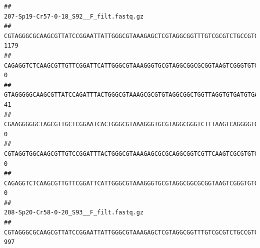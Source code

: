 \documentclass[]{article}
\begin{document}
\begin{verbatim}
##                                                                                                                                                                                                                                                           207-Sp19-Cr57-0-18_S92__F_filt.fastq.gz
## CGTAGGGCGCAAGCGTTATCCGGAATTATTGGGCGTAAAGAGCTCGTAGGCGGTTTGTCGCGTCTGCCGTGAAAGTCCGGGGCTCAACTCCGGATCTGCGGTGGGTACGGGCAGACTAGAGTGATGTAGGGGAGACTGGAATTCCTGGTGTAGCGGTGAAATGCGCAGATATCAGGAGGAACACCGATGGCGAAGGCAGGTCTCTGGGCATTAACTGACGCTGAGGAGCGAAAGCATGGGGAGCGAACA                                    1179
## CAGAGGTCTCAAGCGTTGTTCGGATTCATTGGGCGTAAAGGGTGCGTAGGCGGCGCGGTAAGTCGGGTGTGAAATCTCGGAGCTTAACTCCGAAACTGCATTCGATACTGCCGTGCTTGAGGACTGGAGAGGAGACTGGAATTTACGGTGTAGCGGTGAAATGCGTAGATATCGTAAGGAAGACCAGTGGCGAAGGCGGGTCTCTGGACAGTTCCTGACGCTGAGGCACGAAGGCCAGGGGAGCAAACG                                       0
## GTAGGGGGCAAGCGTTATCCAGATTTACTGGGCGTAAAGCGCGTGTAGGCGGCTGGTTAGGTGTGATGTGAAATCTTCCGGCTCAACCGGAAAACTGCATTGCAAACCGGCCTGGCTAGAGTGCAGGAGAGGGAAGCGGAATTCCAGGTGTAGCGGTGAAATGCGTAGATATCTGGAGGAACACCAGTGGCGAAGGCGGCTTCCTGGCCTGCAACTGACGCTGAGACGCGAAAGCGTGGGGAGCGAAC                                       41
## CGAAGGGGGCTAGCGTTGCTCGGAATCACTGGGCGTAAAGGGTGCGTAGGCGGGTCTTTAAGTCAGGGGTGAAATCCTGGAGCTCAACTCCAGAACTGCCTTTGATACTGAAGATCTTGAGTTCGGGAGAGGTGAGTGGAACTGCGAGTGTAGAGGTGAAATTCGTAGATATTCGCAAGAACACCAGTGGCGAAGGCGGCTCACTGGCCCGATACTGACGCTGAGGCACGAAAGCGTGGGGAGCAAACA                                       0
## CGTAGGTGGCAAGCGTTGTCCGGATTTACTGGGCGTAAAGAGCGCGCAGGCGGTCGTTCAAGTCGCGTGTGAAAGCCCCCGGCTCAACTGGGGAGGGTCACGCGATACTGATCGACTCGAAGGCAGGAGAGGGTAGTGGAATTCCCGGTGTAGTGGTGAAATGCGTAGATATCGGGAGGAACACCAGTGGCGAAGGCGACTACCTGGCCTGTTCTTGACGCTGAGGCGCGAAAGCTAGGGGAGCAAACG                                       0
## CAGAGGTCTCAAGCGTTGTTCGGATTCATTGGGCGTAAAGGGTGCGTAGGCGGCGCGGTAAGTCGGGTGTGAAATCTCGGGGCTTAACTCCGAAACTGCATTCGATACTGCCGTGCTTGAGGACTGGAGAGGAGACTGGAATTTACGGTGTAGCGGTGAAATGCGTAGATATCGTAAGGAAGACCAGTGGCGAAGGCGGGTCTCTGGACAGTTCCTGACGCTGAGGCACGAAGGCCAGGGGAGCAAACG                                       0
##                                                                                                                                                                                                                                                           208-Sp20-Cr58-0-20_S93__F_filt.fastq.gz
## CGTAGGGCGCAAGCGTTATCCGGAATTATTGGGCGTAAAGAGCTCGTAGGCGGTTTGTCGCGTCTGCCGTGAAAGTCCGGGGCTCAACTCCGGATCTGCGGTGGGTACGGGCAGACTAGAGTGATGTAGGGGAGACTGGAATTCCTGGTGTAGCGGTGAAATGCGCAGATATCAGGAGGAACACCGATGGCGAAGGCAGGTCTCTGGGCATTAACTGACGCTGAGGAGCGAAAGCATGGGGAGCGAACA                                     997

\end{verbatim}
\end{document}
